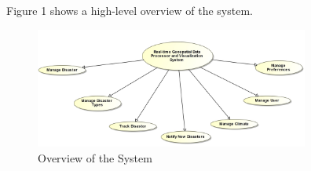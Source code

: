 Figure 1 shows a high-level overview of the system.
\begin{figure}[ht!]
\centering
\includegraphics[width=90mm]{../images/funcReq/systOverview.jpg}
\caption{ Overview of the System \label{overflow}}
\end{figure}